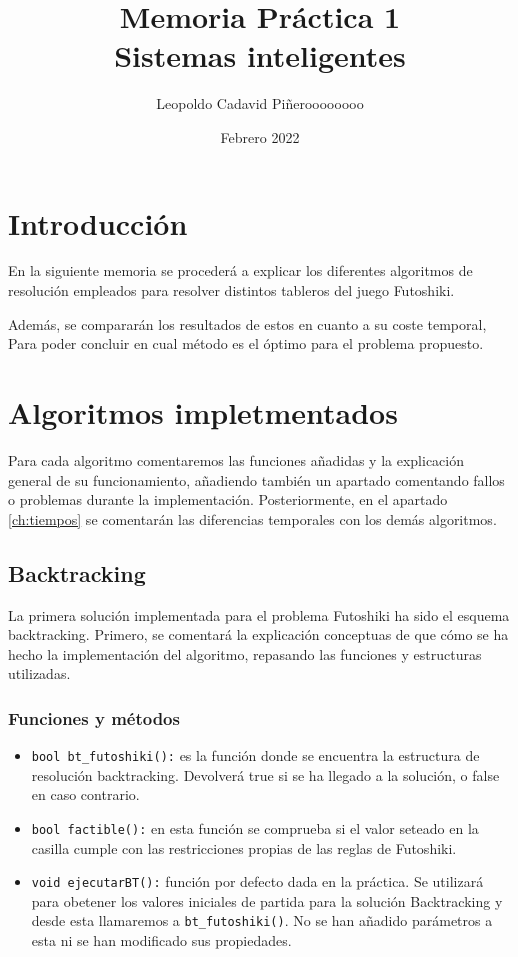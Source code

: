 \documentclass[12pt]{article}
\title{Memoria Práctica 1 \\


\large Sistemas inteligentes
}
\author{
Leopoldo Cadavid Piñeroooooooo
}
\date{Febrero 2022}
\begin{document}
\maketitle
\newpage
\tableofcontents
\newpage
\section{Introducción}

      En la siguiente memoria se procederá a explicar los diferentes algoritmos de resolución
      empleados para resolver distintos tableros del juego Futoshiki.

      Además, se compararán los resultados de estos en cuanto a su coste temporal,
      Para poder concluir en cual método es el óptimo para el problema propuesto. 
      

\section{Algoritmos impletmentados}
Para cada algoritmo comentaremos las funciones añadidas y la explicación general de su funcionamiento, añadiendo también un apartado comentando fallos o
problemas durante la implementación. Posteriormente, en el apartado \ref{ch:tiempos} se comentarán las diferencias temporales 
con los demás algoritmos.

\subsection{Backtracking}
La primera solución implementada para el problema Futoshiki ha sido el 
esquema backtracking. Primero, se comentará la explicación conceptuas de que cómo se ha hecho la implementación
del algoritmo, repasando las funciones y estructuras utilizadas. 
\subsubsection{Funciones y métodos}



\begin{itemize}

    \item \verb|bool bt_futoshiki():| es la función donde se encuentra la estructura
     de resolución backtracking. Devolverá true si se ha llegado a la solución, o false 
     en caso contrario. 

    \item \verb|bool factible():| en esta función se comprueba si el valor 
    seteado en la casilla cumple con las restricciones propias de las reglas de Futoshiki.

    \item \verb|void ejecutarBT():| función por defecto dada en la práctica. Se utilizará
    para obetener los valores iniciales de partida para la solución Backtracking
    y desde esta llamaremos a \verb|bt_futoshiki()|. No se han añadido parámetros a esta ni se han 
    modificado sus propiedades.

    
\end{itemize}
\end{document}
